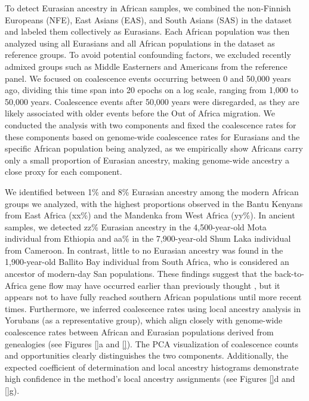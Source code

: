 To detect Eurasian ancestry in African samples, we combined the non-Finnish Europeans (NFE), East Asians (EAS), and South Asians (SAS) in the dataset and labeled them collectively as Eurasians. Each African population was then analyzed using all Eurasians and all African populations in the dataset as reference groups. To avoid potential confounding factors, we excluded recently admixed groups such as Middle Easterners and Americans from the reference panel. We focused on coalescence events occurring between 0 and 50,000 years ago, dividing this time span into 20 epochs on a log scale, ranging from 1,000 to 50,000 years. Coalescence events after 50,000 years were disregarded, as they are likely associated with older events before the Out of Africa migration. We conducted the analysis with two components and fixed the coalescence rates for these components based on genome-wide coalescence rates for Eurasians and the specific African population being analyzed, as we empirically show Africans carry only a small proportion of Eurasian ancestry, making genome-wide ancestry a close proxy for each component.

We identified between 1\% and 8\% Eurasian ancestry among the modern African groups we analyzed, with the highest proportions observed in the Bantu Kenyans from East Africa (xx\%) and the Mandenka from West Africa (yy\%). In ancient samples, we detected zz\% Eurasian ancestry in the 4,500-year-old Mota individual from Ethiopia and aa\% in the 7,900-year-old Shum Laka individual from Cameroon. In contrast, little to no Eurasian ancestry was found in the 1,900-year-old Ballito Bay individual from South Africa, who is considered an ancestor of modern-day San populations. These findings suggest that the back-to-Africa gene flow may have occurred earlier than previously thought \cite{pickrell2012genetic,llorente2015ancient}, but it appears not to have fully reached southern African populations until more recent times. Furthermore, we inferred coalescence rates using local ancestry analysis in Yorubans (as a representative group), which align closely with genome-wide coalescence rates between African and Eurasian populations derived from genealogies (see Figures \ref{}a and \ref{}). The PCA visualization of coalescence counts and opportunities clearly distinguishes the two components. Additionally, the expected coefficient of determination and local ancestry histograms demonstrate high confidence in the method’s local ancestry assignments (see Figures \ref{}d and \ref{}g). 


